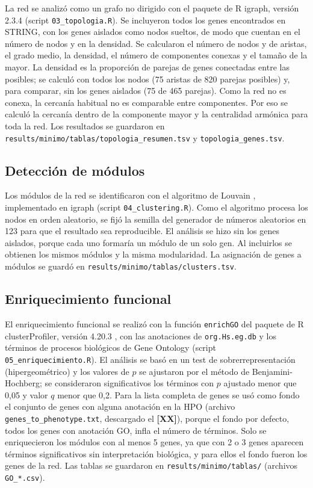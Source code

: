 La red se analizó como un grafo no dirigido con el paquete de R igraph, versión 2.3.4 \cite{Csardi2006,Antonov2023,Csardi2026} (script \texttt{03\_topologia.R}). Se incluyeron todos los genes encontrados en STRING, con los genes aislados como nodos sueltos, de modo que cuentan en el número de nodos y en la densidad. Se calcularon el número de nodos y de aristas, el grado medio, la densidad, el número de componentes conexas y el tamaño de la mayor. La densidad es la proporción de parejas de genes conectadas entre las posibles; se calculó con todos los nodos (75 aristas de 820 parejas posibles) y, para comparar, sin los genes aislados (75 de 465 parejas). Como la red no es conexa, la cercanía habitual no es comparable entre componentes. Por eso se calculó la cercanía dentro de la componente mayor y la centralidad armónica para toda la red. Los resultados se guardaron en \texttt{results/minimo/tablas/topologia\_resumen.tsv} y \texttt{topologia\_genes.tsv}.

\subsection{Detección de módulos}

Los módulos de la red se identificaron con el algoritmo de Louvain \cite{Blondel2008}, implementado en igraph (script \texttt{04\_clustering.R}). Como el algoritmo procesa los nodos en orden aleatorio, se fijó la semilla del generador de números aleatorios en 123 para que el resultado sea reproducible. El análisis se hizo sin los genes aislados, porque cada uno formaría un módulo de un solo gen. Al incluirlos se obtienen los mismos módulos y la misma modularidad. La asignación de genes a módulos se guardó en \texttt{results/minimo/tablas/clusters.tsv}.

\subsection{Enriquecimiento funcional}

El enriquecimiento funcional se realizó con la función \texttt{enrichGO} del paquete de R clusterProfiler, versión 4.20.3 \cite{Wu2021}, con las anotaciones de \texttt{org.Hs.eg.db} y los términos de procesos biológicos de Gene Ontology \cite{Ashburner2000} (script \texttt{05\_enriquecimiento.R}). El análisis se basó en un test de sobrerrepresentación (hipergeométrico) y los valores de $p$ se ajustaron por el método de Benjamini-Hochberg; se consideraron significativos los términos con $p$ ajustado menor que 0,05 y valor $q$ menor que 0,2. Para la lista completa de genes se usó como fondo el conjunto de genes con alguna anotación en la HPO (archivo \texttt{genes\_to\_phenotype.txt}, descargado el \textbf{[XX]}), porque el fondo por defecto, todos los genes con anotación GO, infla el número de términos. Solo se enriquecieron los módulos con al menos 5 genes, ya que con 2 o 3 genes aparecen términos significativos sin interpretación biológica, y para ellos el fondo fueron los genes de la red. Las tablas se guardaron en \texttt{results/minimo/tablas/} (archivos \texttt{GO\_*.csv}).

